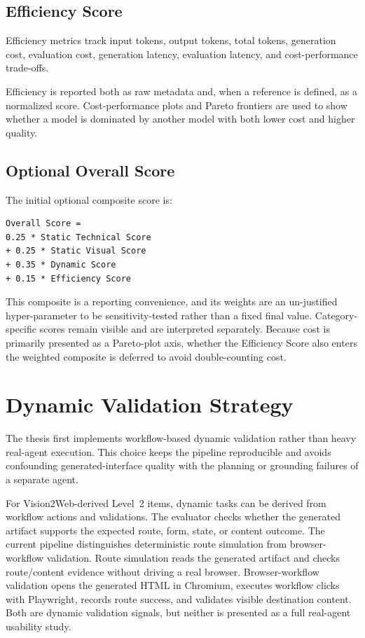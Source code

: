 \subsection{Efficiency Score}

Efficiency metrics track input tokens, output tokens, total tokens, generation
cost, evaluation cost, generation latency, evaluation latency, and
cost-performance trade-offs.

Efficiency is reported both as raw metadata and, when a reference is defined, as
a normalized score. Cost-performance plots and Pareto frontiers are used to show
whether a model is dominated by another model with both lower cost and higher
quality.

\subsection{Optional Overall Score}

The initial optional composite score is:

\begin{verbatim}
Overall Score =
0.25 * Static Technical Score
+ 0.25 * Static Visual Score
+ 0.35 * Dynamic Score
+ 0.15 * Efficiency Score
\end{verbatim}

This composite is a reporting convenience, and its weights are an
un-justified hyper-parameter to be sensitivity-tested rather than a fixed final
value. Category-specific scores remain visible and are interpreted separately.
Because cost is primarily presented as a Pareto-plot axis, whether the
Efficiency Score also enters the weighted composite is deferred to avoid
double-counting cost.

\section{Dynamic Validation Strategy}
\label{sec:dynamic-method}

The thesis first implements workflow-based dynamic validation rather than heavy
real-agent execution. This choice keeps the pipeline reproducible and avoids
confounding generated-interface quality with the planning or grounding failures
of a separate agent.

For Vision2Web-derived Level~2 items, dynamic tasks can be derived from
workflow actions and validations. The evaluator checks whether the generated
artifact supports the expected route, form, state, or content outcome. The
current pipeline distinguishes deterministic route simulation from
browser-workflow validation. Route simulation reads the generated artifact and
checks route/content evidence without driving a real browser. Browser-workflow
validation opens the generated HTML in Chromium, executes workflow clicks with
Playwright, records route success, and validates visible destination content.
Both are dynamic validation signals, but neither is presented as a full
real-agent usability study.

